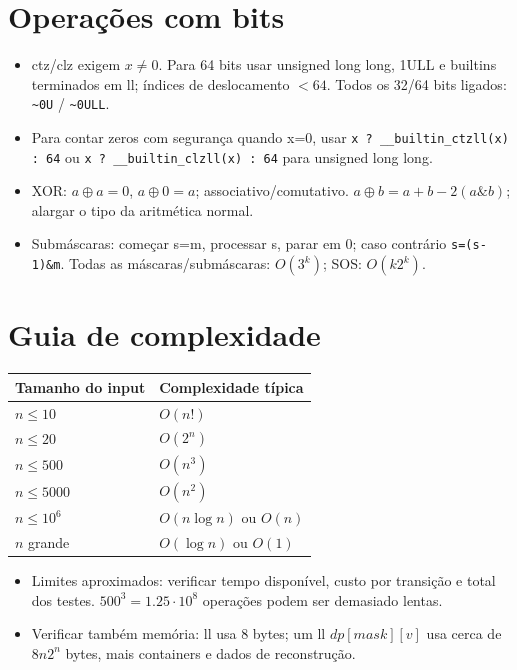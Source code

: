 \section{Operações com bits}
\leavevmode\par\nobreak

\begin{itemize}[nosep,leftmargin=*]
\item ctz/clz exigem $x\ne0$. Para 64 bits usar unsigned long long,
1ULL e builtins terminados em ll; índices de deslocamento $<64$.
Todos os 32/64 bits ligados: \lstinline|~0U| / \lstinline|~0ULL|.
\item Para contar zeros com segurança quando x=0, usar
\lstinline|x ? __builtin_ctzll(x) : 64| ou
\lstinline|x ? __builtin_clzll(x) : 64| para unsigned long long.
\item XOR: $a\oplus a=0$, $a\oplus0=a$; associativo/comutativo.
$a\oplus b=a+b-2(a\mathbin{\&}b)$; alargar o tipo da aritmética normal.
\item Submáscaras: começar s=m, processar s, parar em 0; caso contrário
\lstinline|s=(s-1)&m|. Todas as máscaras/submáscaras: $O(3^k)$; SOS: $O(k2^k)$.
\end{itemize}

\section{Guia de complexidade}
\begin{tabular}{@{}ll@{}}
\textbf{Tamanho do input} & \textbf{Complexidade típica} \\
\hline
$n\le10$ & $O(n!)$ \\
$n\le20$ & $O(2^n)$ \\
$n\le500$ & $O(n^3)$ \\
$n\le5000$ & $O(n^2)$ \\
$n\le10^6$ & $O(n\log n)$ ou $O(n)$ \\
$n$ grande & $O(\log n)$ ou $O(1)$ \\
\end{tabular}
\begin{itemize}[nosep,leftmargin=*]
\item Limites aproximados: verificar tempo disponível, custo por transição
 e total dos testes. $500^3=1.25\cdot10^8$ operações podem ser demasiado lentas.
\item Verificar também memória: ll usa 8 bytes; um ll $dp[mask][v]$
 usa cerca de $8n2^n$ bytes, mais containers e dados de reconstrução.
\end{itemize}
